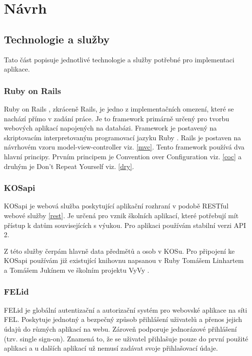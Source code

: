 \chapter{Návrh}

\section{Technologie a služby}
Tato část popisuje jednotlivé technologie a služby potřebné pro implementaci aplikace.

\subsection{Ruby on Rails}
Ruby on Rails \cite{rubyonrails}, zkráceně Rails, je jedno z implementačních omezení, které se nachází přímo v zadání práce. Je to framework primárně určený pro tvorbu webových aplikací napojených na databázi. Framework je postavený na skriptovacím interpretovaným programovací jazyku Ruby \cite{ruby}. Rails je postaven na návrhovém vzoru model-view-controller viz. \ref{mvc}. Tento framework používá dva hlavní principy. Prvním principem je Convention over Configuration viz. \ref{coc} a druhým je Don’t Repeat Yourself viz. \ref{dry}.

\subsection{KOSapi}
\label{kosapi}
KOSapi je webová služba poskytující aplikační rozhraní v podobě RESTful webové služby \ref{rest}. Je určená pro vznik školních aplikací, které potřebují mít přístup k datům souvisejících s výukou. Pro aplikaci používám stabilní verzi API 2. 

Z této služby čerpám hlavně data předmětů a osob v KOSu. Pro připojení ke KOSapi používám již existující knihovnu napsanou v Ruby Tomášem Linhartem a Tomášem Jukínem ve školním projektu VyVy \cite{vyvy_project}.  

\subsection{FELid}
\label{felid}
FELid \cite{felid} je globální autentizační a autorizační systém pro webovské aplikace na síti FEL. Poskytuje jednotný a bezpečný způsob přihlášení uživatelů a přenos jejich údajů do různých aplikací na webu. Zároveň podporuje jednorázové přihlášení (tzv. single sign-on). Znamená to, že se uživatel přihlašuje pouze do první použité aplikaci a u dalších aplikací už nemusí zadávat svoje přihlašovací údaje.


